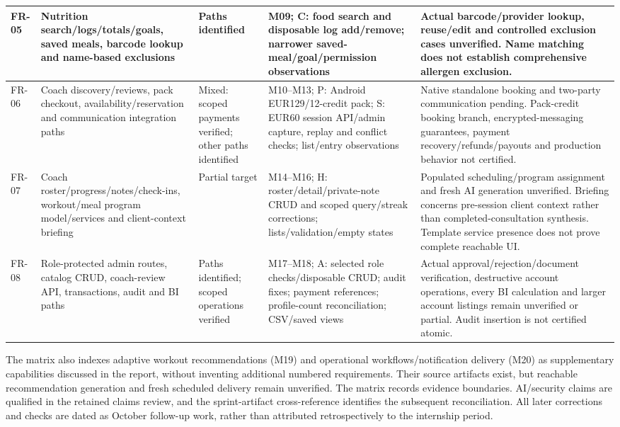\documentclass[12pt,a4paper,openany]{report}
\begin{document}
\begin{longtable}{|L{1.15cm}|L{3.35cm}|L{2.05cm}|L{3.95cm}|L{4.10cm}|}
FR-05 & Nutrition search\slash{}logs\slash{}totals\slash{}goals, saved meals, barcode lookup and name-based exclusions & Paths identified & M09; C: food search and disposable log add\slash{}remove; narrower saved-meal\slash{}goal\slash{}permission observations & Actual barcode\slash{}provider lookup, reuse\slash{}edit and controlled exclusion cases unverified. Name matching does not establish comprehensive allergen exclusion. \\ \hline
FR-06 & Coach discovery\slash{}reviews, pack checkout, availability\slash{}reservation and communication integration paths & Mixed: scoped payments verified; other paths identified & M10--M13; P: Android EUR129\slash{}12-credit pack; S: EUR60 session API\slash{}admin capture, replay and conflict checks; list\slash{}entry observations & Native standalone booking and two-party communication pending. Pack-credit booking branch, encrypted-messaging guarantees, payment recovery\slash{}refunds\slash{}payouts and production behavior not certified. \\ \hline
FR-07 & Coach roster\slash{}progress\slash{}notes\slash{}check-ins, workout\slash{}meal program model\slash{}services and client-context briefing & Partial target & M14--M16; H: roster\slash{}detail\slash{}private-note CRUD and scoped query\slash{}streak corrections; lists\slash{}validation\slash{}empty states & Populated scheduling\slash{}program assignment and fresh AI generation unverified. Briefing concerns pre-session client context rather than completed-consultation synthesis. Template service presence does not prove complete reachable UI. \\ \hline
FR-08 & Role-protected admin routes, catalog CRUD, coach-review API, transactions, audit and BI paths & Paths identified; scoped operations verified & M17--M18; A: selected role checks\slash{}disposable CRUD; audit fixes; payment references; profile-count reconciliation; CSV\slash{}saved views & Actual approval\slash{}rejection\slash{}document verification, destructive account operations, every BI calculation and larger account listings remain unverified or partial. Audit insertion is not certified atomic. \\ \hline
\end{longtable}
\endgroup

The matrix also indexes adaptive workout recommendations (M19) and operational workflows/notification delivery (M20) as supplementary capabilities discussed in the report, without inventing additional numbered requirements. Their source artifacts exist, but reachable recommendation generation and fresh scheduled delivery remain unverified. The matrix records evidence boundaries. AI/security claims are qualified in the retained claims review, and the sprint-artifact cross-reference identifies the subsequent reconciliation. All later corrections and checks are dated as October follow-up work, rather than attributed retrospectively to the internship period.
\end{document}
